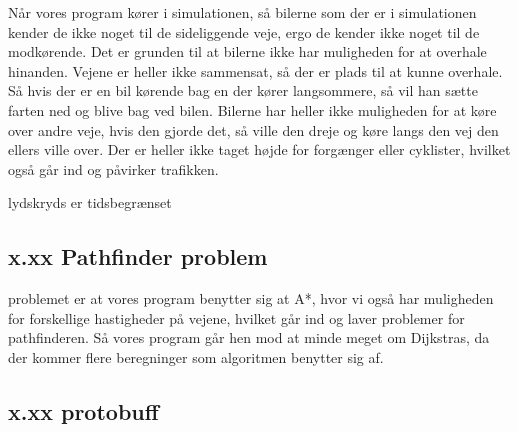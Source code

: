 \vspace{5mm}

Når vores program kører i simulationen, så bilerne som der er i simulationen kender de ikke noget til de sideliggende veje, ergo de kender ikke noget til de modkørende. Det er grunden til at bilerne ikke har muligheden for at overhale hinanden. Vejene er heller ikke sammensat, så der er plads til at kunne overhale. Så hvis der er en bil kørende bag en der kører langsommere, så vil han sætte farten ned og blive bag ved bilen. Bilerne har heller ikke muligheden for at køre over andre veje, hvis den gjorde det, så ville den dreje og køre langs den vej den ellers ville over. Der er heller ikke taget højde for forgænger eller cyklister, hvilket også går ind og påvirker trafikken. 




lydskryds er tidsbegrænset



\subsection{x.xx Pathfinder problem}
problemet er at vores program benytter sig at A*, hvor vi også har muligheden for forskellige hastigheder på vejene, hvilket går ind og laver problemer for pathfinderen. Så vores program går hen mod at minde meget om Dijkstras, da der kommer flere beregninger som algoritmen benytter sig af.


\subsection{x.xx protobuff}



